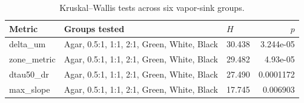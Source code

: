 
\begin{table}[htbp]
\centering
\caption{Kruskal--Wallis tests across six vapor-sink groups.}
\label{tab:kw}
\begin{tabular}{lllr}
\toprule
Metric & Groups tested & $H$ & $p$ \\
\midrule
delta_um & Agar, 0.5:1, 1:1, 2:1, Green, White, Black & 30.438 & 3.244e-05 \\
zone_metric & Agar, 0.5:1, 1:1, 2:1, Green, White, Black & 29.482 & 4.93e-05 \\
dtau50_dr & Agar, 0.5:1, 1:1, 2:1, Green, White, Black & 27.490 & 0.0001172 \\
max_slope & Agar, 0.5:1, 1:1, 2:1, Green, White, Black & 17.745 & 0.006903 \\
\bottomrule
\end{tabular}
\end{table}


